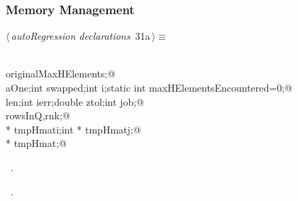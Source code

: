 \documentclass{article}
\begin{document}
\subsubsection{Memory Management}

\begin{flushleft} \small
\begin{minipage}{\linewidth}\label{scrap35}\raggedright\small
{} $\langle\,${\itshape autoRegression declarations}\nobreak\ {\footnotesize {31a}}$\,\rangle\equiv$
\vspace{-1ex}
\begin{list}{}{} \item
\mbox{}\verb@@\\
\mbox{}\verb@int originalMaxHElements;@\\
\mbox{}\verb@int aOne;int swapped;int i;static int maxHElementsEncountered=0;@\\
\mbox{}\verb@int len;int ierr;double ztol;int job;@\\
\mbox{}\verb@int rowsInQ,rnk;@\\
\mbox{}\verb@int * tmpHmati;int * tmpHmatj;@\\
\mbox{}\verb@double * tmpHmat;@\\
\mbox{}\verb@@{\NWsep}
\end{list}
\vspace{-1.5ex}
\footnotesize
\begin{list}{}{\setlength{\itemsep}{-\parsep}\setlength{\itemindent}{-\leftmargin}}
\item \NWtxtMacroDefBy\ .
\item \NWtxtMacroRefIn\ .

\end{list}
\end{minipage}
\end{flushleft}
\end{document}
